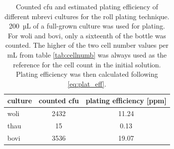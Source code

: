 \begin{table}[ht]
\centering
\caption[Counted \acrfull{cfu} and estimated plating efficiency of different \acrfull{mbrevi} cultures for the roll plating technique.]{Counted \acrfull{cfu} and estimated plating efficiency of different \acrfull{mbrevi} cultures for the roll plating technique. 200~µL of a full-grown culture was used for plating. For \acrshort{woli} and \acrshort{bovi}, only a sixteenth of the bottle was counted. The higher of the two cell number values per mL from table \ref{tab:cellnumb} was always used as the reference for the cell count in the initial solution. Plating efficiency was then calculated following \cref{eq:plat_eff}.}
\label{tab:roll_plat_eff}
\begin{tabular}{lcc}
  \toprule
  culture & counted \acrshort{cfu} & plating efficiency [ppm] \\ 
  \midrule
 \acrshort{woli} & 2432 & 11.24 \\ 
 \acrshort{thau} & 15 & 0.13 \\ 
\acrshort{bovi} & 3536 & 19.07 \\ 
   \bottomrule
\end{tabular}
\end{table}
